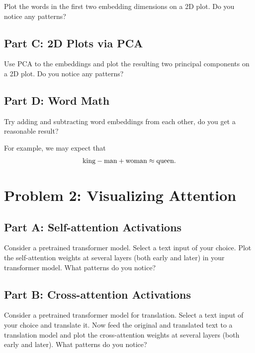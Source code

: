 \documentclass{article}
\begin{document}
Plot the words in the first two embedding dimensions on a 2D plot.
Do you notice any patterns?

\subsection*{Part C: 2D Plots via PCA}

Use PCA to the embeddings and plot the resulting two principal components on a 2D plot.
Do you notice any patterns?

\subsection*{Part D: Word Math}

Try adding and subtracting word embeddings from each other, do you get a reasonable result?

For example, we may expect that
\begin{align*}
    \textnormal{king} - \textnormal{man} + \textnormal{woman} \approx \textnormal{queen}.
\end{align*}

%

\newpage
\section*{Problem 2: Visualizing Attention}

\subsection*{Part A: Self-attention Activations}

Consider a pretrained transformer model.
Select a text input of your choice.
Plot the self-attention weights at several layers (both early and later) in your transformer model. What patterns do you notice?

\subsection*{Part B: Cross-attention Activations}

Consider a pretrained transformer model for translation.
Select a text input of your choice and translate it.
Now feed the original and translated text to a translation model and plot the cross-attention weights at several layers (both early and later). What patterns do you notice?

%
\end{document}
